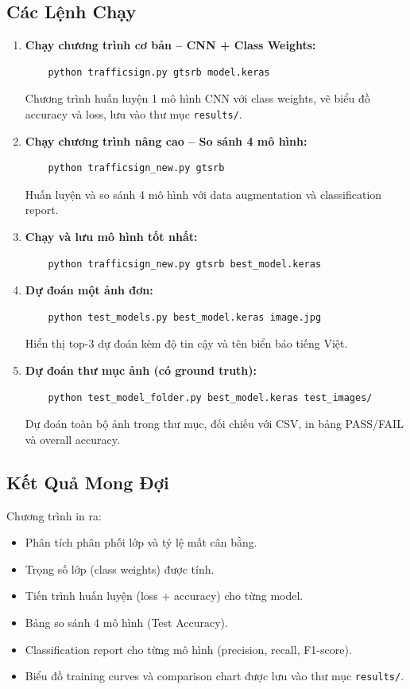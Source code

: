 \documentclass[12pt,a4paper]{article}
\begin{document}
\subsection{Các Lệnh Chạy}
\begin{enumerate}[leftmargin=*]
    \item \textbf{Chạy chương trình cơ bản -- CNN + Class Weights:}
    \begin{verbatim}
    python trafficsign.py gtsrb model.keras
    \end{verbatim}
    Chương trình huấn luyện 1 mô hình CNN với class weights, vẽ biểu đồ accuracy và loss, lưu vào thư mục \texttt{results/}.

    \item \textbf{Chạy chương trình nâng cao -- So sánh 4 mô hình:}
    \begin{verbatim}
    python trafficsign_new.py gtsrb
    \end{verbatim}
    Huấn luyện và so sánh 4 mô hình với data augmentation và classification report.

    \item \textbf{Chạy và lưu mô hình tốt nhất:}
    \begin{verbatim}
    python trafficsign_new.py gtsrb best_model.keras
    \end{verbatim}

    \item \textbf{Dự đoán một ảnh đơn:}
    \begin{verbatim}
    python test_models.py best_model.keras image.jpg
    \end{verbatim}
    Hiển thị top-3 dự đoán kèm độ tin cậy và tên biển báo tiếng Việt.

    \item \textbf{Dự đoán thư mục ảnh (có ground truth):}
    \begin{verbatim}
    python test_model_folder.py best_model.keras test_images/
    \end{verbatim}
    Dự đoán toàn bộ ảnh trong thư mục, đối chiếu với CSV, in bảng PASS/FAIL và overall accuracy.
\end{enumerate}

\subsection{Kết Quả Mong Đợi}
Chương trình in ra:
\begin{itemize}
    \item Phân tích phân phối lớp và tỷ lệ mất cân bằng.
    \item Trọng số lớp (class weights) được tính.
    \item Tiến trình huấn luyện (loss + accuracy) cho từng model.
    \item Bảng so sánh 4 mô hình (Test Accuracy).
    \item Classification report cho từng mô hình (precision, recall, F1-score).
    \item Biểu đồ training curves và comparison chart được lưu vào thư mục \texttt{results/}.
\end{itemize}
\end{document}
